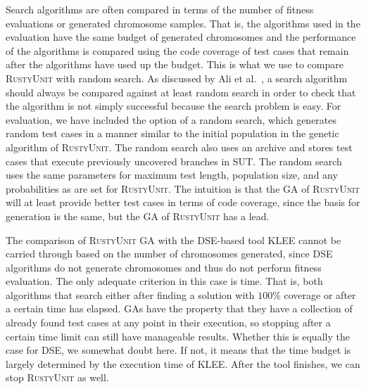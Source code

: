 \documentclass[paper=a4,%
  twoside,%
  BCOR4mm,%
  abstract=true,%
  toc=bibliography,%
  chapterprefix=true,%
  toc=bibliographynumbered,%
  open=right,%
  english,%
  pagesize=pdftex]{scrreprt}
\begin{document}
Search algorithms are often compared in terms of the number of fitness evaluations or generated chromosome samples. That is, the algorithms used in the evaluation have the same budget of generated chromosomes and the performance of the algorithms is compared using the code coverage of test cases that remain after the algorithms have used up the budget. This is what we use to compare \textsc{RustyUnit} with random search. As discussed by Ali et al.~\cite{Ali2010}, a search algorithm should always be compared against at least random search in order to check that the algorithm is not simply successful because the search problem is easy. For evaluation, we have included the option of a random search, which generates random test cases in a manner similar to the initial population in the genetic algorithm of \textsc{RustyUnit}. The random search also uses an archive and stores test cases that execute previously uncovered branches in \ac{SUT}. The random search uses the same parameters for maximum test length, population size, and any probabilities as are set for \textsc{RustyUnit}. The intuition is that the \ac{GA} of \textsc{RustyUnit} will at least provide better test cases in terms of code coverage, since the basis for generation is the same, but the \ac{GA} of \textsc{RustyUnit} has a lead.


The comparison of \textsc{RustyUnit} \ac{GA} with the \ac{DSE}-based tool \textsc{KLEE} cannot be carried through based on the number of chromosomes generated, since \ac{DSE} algorithms do not generate chromosomes and thus do not perform fitness evaluation. The only adequate criterion in this case is time. That is, both algorithms that search either after finding a solution with $100\%$ coverage or after a certain time has elapsed. \acp{GA} have the property that they have a collection of already found test cases at any point in their execution, so stopping after a certain time limit can still have manageable results. Whether this is equally the case for \ac{DSE}, we somewhat doubt here. If not, it means that the time budget is largely determined by the execution time of \textsc{KLEE}. After the tool finishes, we can stop \textsc{RustyUnit} as well.
\end{document}
